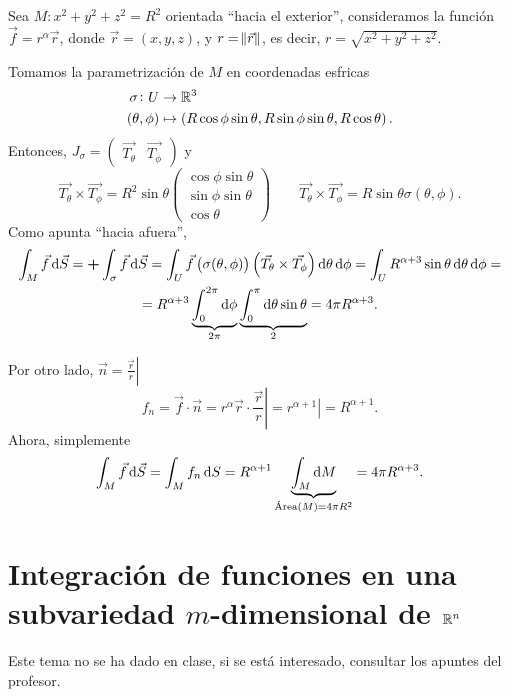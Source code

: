 \begin{example}
    Sea $M : x^2 + y^2 + z^2 = R^2$ orientada ``hacia el exterior'', consideramos la función $\vec{f} = r^\alpha \vec{r}$, donde
    $\vec{r} = (x,y,z)$, y $r = \norm{\vec{r}}$, es decir, $r = \sqrt{x^2 + y^2 + z^2}$.

    Tomamos la parametrización de $M$ en coordenadas esfricas
    \[
        \begin{aligned}
            \sigma \colon U &\to \mathbb{R}^3 \\
            (\theta, \phi) &\mapsto \left( R \cos \phi \sin \theta, R\sin \phi \sin \theta, R\cos \theta \right).
        \end{aligned}
    \]
    Entonces, $J_\sigma = \begin{pmatrix} \vec{T_\theta} & \vec{T_\phi} \end{pmatrix}$ y
    \[
        \vec{T_\theta} \times \vec{T_\phi} = R^2 \sin\theta
        \begin{pmatrix}
            \cos\phi\sin\theta \\ \sin\phi\sin\theta \\ \cos\theta
        \end{pmatrix} \qquad
        \vec{T_\theta} \times \vec{T_\phi} = R \sin\theta \sigma(\theta, \phi).
    \]
    Como apunta ``hacia afuera'', 
    \begin{gather*}
        \int_M \vec{f} \dif \vec{S} = \textbf{+} \int_\sigma \vec{f} \dif \vec{S} = 
        \int_U \vec{f} \left( \sigma(\theta, \phi)\right) \left( \vec{T_\theta} \times \vec{T_\phi} \right) \dif \theta \dif \phi =
        \int_U R^{\alpha+3} \sin \theta \dif \theta \dif \phi =\\= R^{\alpha+3} \underbrace{\int^{2\pi}_0 \dif \phi}_{2\pi}
        \underbrace{ \int^\pi_0 \dif \theta \sin \theta }_{2} = 4\pi R^{\alpha+3}.
    \end{gather*}

    Por otro lado, $\vec{n} = \left. \frac{\vec{r}}{r} \right\vert$
    \[
        f_n = \vec{f} \cdot \vec{n} = r^{\alpha} \vec{r} \cdot \left.\frac{\vec{r}}{r}\right\vert = \left. r^{\alpha+1}\right\vert = R^{\alpha+1}.
    \]
    Ahora, simplemente
    \[
        \int_M \vec{f} \dif \vec{S} = \int_M f_n \dif S = R^{\alpha+1} \underbrace{\int_M \dif M}_{\text{Área}(M) = 4\pi R^2} = 4\pi R^{\alpha+3}.
    \]
\end{example}

\section[Integración de funciones en una subvariedad $m$-dimensional de $\real^n$]{
        Integración de funciones en una subvariedad $m$-dimensional de $\real^n$
        }

Este tema no se ha dado en clase, si se está interesado, consultar los apuntes del profesor.
